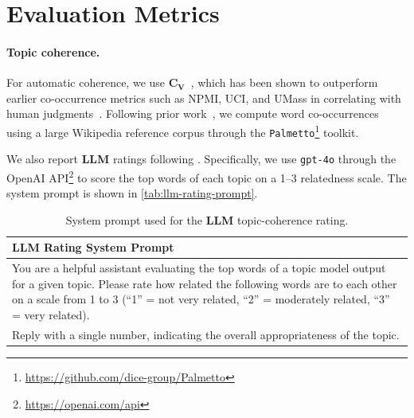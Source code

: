 \documentclass{article}
\theoremstyle{plain}
\theoremstyle{definition}
\theoremstyle{remark}
\begin{document}
\section{Evaluation Metrics}
\label{sec:evaluation-metric-details}


\paragraph{Topic coherence.}
For automatic coherence, we use $\mathbf{C_V}$~\citep{roder2015exploring}, which has been shown to outperform earlier co-occurrence metrics such as NPMI, UCI, and UMass in correlating with human judgments~\citep{newman-etal-2010-automatic, stevens-etal-2012-exploring, lau-etal-2014-machine, roder2015exploring}. Following prior work~\citep{roder2015exploring, wu2023effective, wu2024fastopic}, we compute word co-occurrences using a large Wikipedia reference corpus through the \texttt{Palmetto}\footnote{\url{https://github.com/dice-group/Palmetto}} toolkit.

We also report \textbf{LLM} ratings following \citet{stammbach-etal-2023-revisiting}. Specifically, we use \texttt{gpt-4o} through the OpenAI API\footnote{\url{https://openai.com/api}} to score the top words of each topic on a 1--3 relatedness scale. The system prompt is shown in \autoref{tab:llm-rating-prompt}.

\begin{table}[h]
\centering
\begin{tabularx}{\linewidth}{X}
\toprule
\textbf{LLM Rating System Prompt} \\
\midrule
You are a helpful assistant evaluating the top words of a topic model output for a given topic. Please rate how related the following words are to each other on a scale from 1 to 3 (``1'' = not very related, ``2'' = moderately related, ``3'' = very related).\\[2pt]
Reply with a single number, indicating the overall appropriateness of the topic.\\
\bottomrule
\end{tabularx}
\caption{System prompt used for the \textbf{LLM} topic-coherence rating.}
\label{tab:llm-rating-prompt}
\vspace{-1em}
\end{table}
\end{document}
